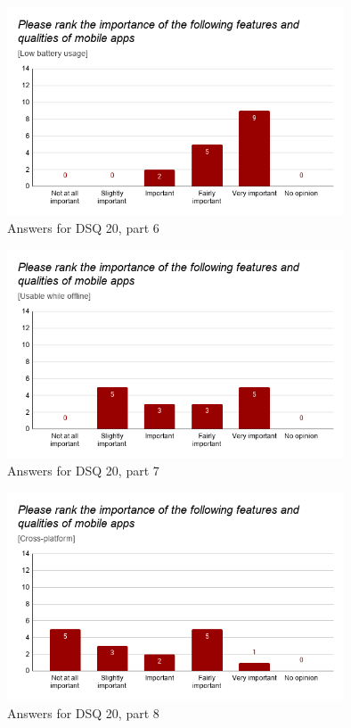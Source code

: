 \documentclass[a4paper,12pt]{article}
\begin{document}
\begin{figure}[ht!]
    \centering
    \includegraphics[width=10cm]{img/Results/dsq20_6.png}
    \caption{Answers for DSQ 20, part 6}
    \label{fig:res_devq20_6}
\end{figure}
\newpage

\begin{figure}[ht!]
    \centering
    \includegraphics[width=10cm]{img/Results/dsq20_7.png}
    \caption{Answers for DSQ 20, part 7}
    \label{fig:res_devq20_7}
\end{figure}

\begin{figure}[ht!]
    \centering
    \includegraphics[width=10cm]{img/Results/dsq20_8.png}
    \caption{Answers for DSQ 20, part 8}
    \label{fig:res_devq20_8}
\end{figure}
\end{document}
